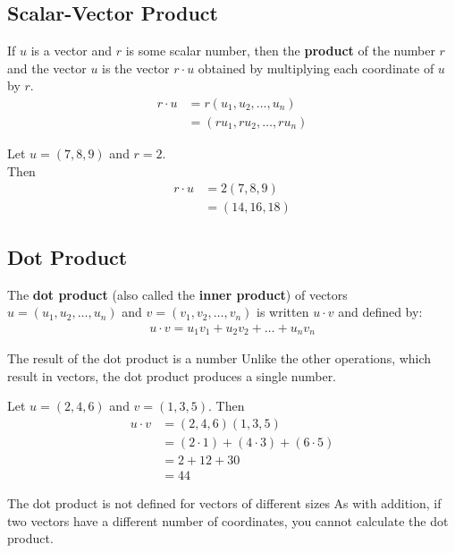 \documentclass[../notes.tex]{subfiles}
\begin{document}
			\subsection{Scalar-Vector Product}
				If $u$ is a vector and $r$ is some scalar number, then the \textbf{product} of the number $r$ and the vector $u$ is the vector $r \cdot u$ obtained by multiplying each coordinate of $u$ by $r$.
				\begin{align*}
					r\cdot u &= r(u_{1}, u_{2}, \ldots, u_{n})\\
					&= (ru_{1}, ru_{2}, \ldots, ru_{n})
				\end{align*}
				\begin{examplebox}
					Let $u = (7, 8, 9)$ and $r = 2$.\\
					Then
					\begin{align*}
						r \cdot u &= 2(7, 8, 9)\\
						&= (14, 16, 18)
					\end{align*}
				\end{examplebox}
			\subsection{Dot Product}
				The \textbf{dot product} (also called the \textbf{inner product}) of vectors $u = (u_{1}, u_{2}, \ldots, u_{n})$ and $v = (v_{1}, v_{2}, \ldots, v_{n})$ is written $u \cdot v$ and defined by:
				\begin{align*}
					u \cdot v = u_{1}v_{1} + u_{2}v_{2} + \ldots + u_{n}v_{n}
				\end{align*}
				\begin{notebox}{The result of the dot product is a number}
					Unlike the other operations, which result in vectors, the dot product produces a single number.
				\end{notebox}
				\begin{examplebox}
					Let $u = (2, 4, 6)$ and $v = (1, 3, 5)$. Then
					\begin{align*}
						u \cdot v &= (2, 4, 6)(1, 3, 5)\\
						&= (2 \cdot 1) + (4 \cdot 3) + (6 \cdot 5)\\
						&= 2 + 12 + 30\\
						&= 44
					\end{align*}
				\end{examplebox}
				\begin{notebox}{The dot product is not defined for vectors of different sizes}
					As with addition, if two vectors have a different number of coordinates, you cannot calculate the dot product.
				\end{notebox}
		\pagebreak
\end{document}
